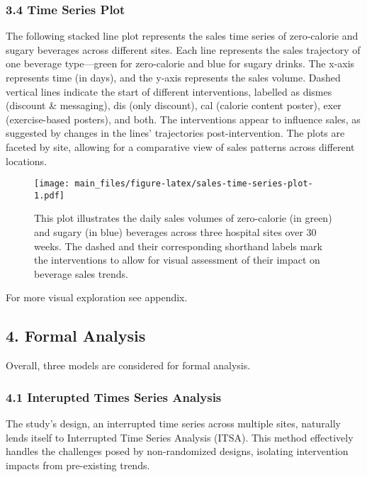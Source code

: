 \documentclass[
]{article}
\begin{document}
\hypertarget{time-series-plot}{%
\subsubsection{3.4 Time Series Plot}\label{time-series-plot}}

The following stacked line plot represents the sales time series of
zero-calorie and sugary beverages across different sites. Each line
represents the sales trajectory of one beverage type---green for
zero-calorie and blue for sugary drinks. The x-axis represents time (in
days), and the y-axis represents the sales volume. Dashed vertical lines
indicate the start of different interventions, labelled as dismes
(discount \& messaging), dis (only discount), cal (calorie content
poster), exer (exercise-based posters), and both. The interventions
appear to influence sales, as suggested by changes in the lines'
trajectories post-intervention. The plots are faceted by site, allowing
for a comparative view of sales patterns across different locations.

\begin{figure}
\centering
\texttt{[image: main\_files/figure-latex/sales-time-series-plot-1.pdf]}
\caption{This plot illustrates the daily sales volumes of zero-calorie
(in green) and sugary (in blue) beverages across three hospital sites
over 30 weeks. The dashed and their corresponding shorthand labels mark
the interventions to allow for visual assessment of their impact on
beverage sales trends.}
\end{figure}

For more visual exploration see appendix.

\hypertarget{formal-analysis}{%
\subsection{4. Formal Analysis}\label{formal-analysis}}

Overall, three models are considered for formal analysis.

\hypertarget{interupted-times-series-analysis}{%
\subsubsection{4.1 Interupted Times Series
Analysis}\label{interupted-times-series-analysis}}

The study's design, an interrupted time series across multiple sites,
naturally lends itself to Interrupted Time Series Analysis (ITSA). This
method effectively handles the challenges posed by non-randomized
designs, isolating intervention impacts from pre-existing trends.
\end{document}
